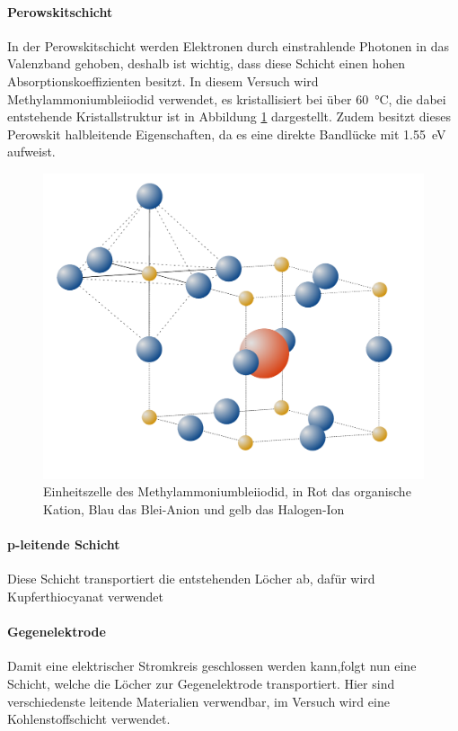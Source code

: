 \documentclass[12pt,a4paper,ngerman]{report}
\begin{document}
	\paragraph{Perowskitschicht}
	In der Perowskitschicht werden Elektronen durch einstrahlende Photonen in das Valenzband gehoben, deshalb ist wichtig, dass diese Schicht einen hohen Absorptionskoeffizienten besitzt. In diesem Versuch wird Methylammoniumbleiiodid  verwendet, es kristallisiert bei über \SI{60}{\celsius}, die dabei entstehende Kristallstruktur ist in Abbildung \ref{img:PerwoskitZelle} dargestellt. Zudem besitzt dieses Perowskit halbleitende Eigenschaften, da es eine direkte Bandlücke mit \SI{1.55}{\eV} aufweist.
	\begin{figure}[ht]
		\centering
		\includegraphics[width=\textwidth]{Bilder/PerwoskitZelle.pdf}		
		\caption[Einheitszelle von ]{Einheitszelle des Methylammoniumbleiiodid, in Rot das organische Kation, Blau das Blei-Anion und gelb das Halogen-Ion}
		\label{img:PerwoskitZelle}
	\end{figure}
	\paragraph{p-leitende Schicht}
	Diese Schicht transportiert die entstehenden Löcher ab, dafür wird Kupferthiocyanat  verwendet
	\paragraph{Gegenelektrode}
	Damit eine elektrischer Stromkreis geschlossen werden kann,folgt nun eine Schicht, welche die Löcher zur Gegenelektrode transportiert. Hier sind verschiedenste leitende Materialien verwendbar, im Versuch wird eine Kohlenstoffschicht verwendet.
\end{document}
